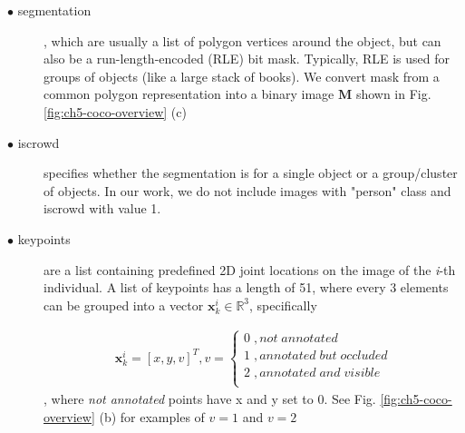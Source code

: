 \begin{description}
	\item [$\bullet$ segmentation], which are usually a list of polygon vertices around the object, but can also be a run-length-encoded (RLE) bit mask. Typically, RLE is used for groups of objects (like a large stack of books). We convert mask from a common polygon representation into a binary image $\mathbf{M}$ shown in Fig. \ref{fig:ch5-coco-overview} (c)
	
	\item [$\bullet$ iscrowd] specifies whether the segmentation is for a single object or a group/cluster of objects. In our work, we do not include images with "person" class and iscrowd with value 1.
	
	\item [$\bullet$ keypoints] are a list containing predefined 2D joint locations on the image of the \textit{i}-th individual. A list of keypoints has a length of 51, where every 3 elements can be grouped into a vector $\mathbf{x}_k^i \in \mathbb{R}^3$, specifically
	
	\begin{gather}
	\mathbf{x}_k^i = \left[x, y, v\right]^T, v = \left\{ 
	\begin{array}{ll}
	0\;, not\;annotated \\
	1\;, annotated\;but\;occluded\\
	2\;, annotated\;and\;visible\\
	\end{array}
	\right.
	\label{eq:joint-definition}
	\end{gather}
	, where \textit{not annotated} points have x and y set to 0. See Fig. \ref{fig:ch5-coco-overview} (b) for examples of $v = 1$ and $v=2$
	
	
\end{description}

